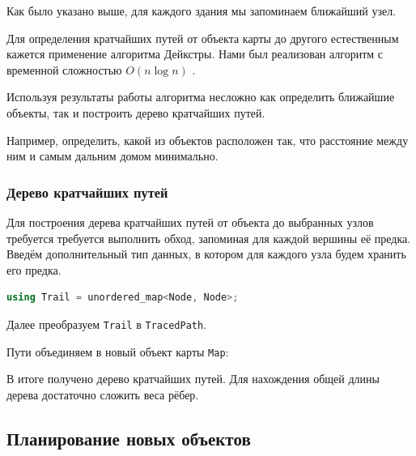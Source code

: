 \documentclass[11pt]{article}
\begin{document}
    Как было указано выше, для каждого здания мы запоминаем ближайший узел.
    
    
    
    Для определения кратчайших путей от объекта карты до другого естественным кажется применение алгоритма Дейкстры.
    Нами был реализован алгоритм с временной сложностью $ O(n \log n) $ \cite{clrs}.
    
    
    
    Используя результаты работы алгоритма несложно как определить ближайшие объекты, так и построить дерево кратчайших путей.
    
    Например, определить, какой из объектов расположен так, что расстояние между ним и самым дальним домом минимально.
    
    

	    
    
	\subsubsection{Дерево кратчайших путей}\label{subsubsection:shortest_paths_tree}    
    
    Для построения дерева кратчайших путей от объекта до выбранных узлов требуется требуется выполнить обход, запоминая для каждой вершины её предка.
    Введём дополнительный тип данных, в котором для каждого узла будем хранить его предка.
    
    \begin{lstlisting}[language=C++]
using Trail = unordered_map<Node, Node>;    
    \end{lstlisting}
    
	

	Далее преобразуем \texttt{Trail} в \texttt{TracedPath}.
	
	

	Пути объединяем в новый объект карты \texttt{Map}:

	

	В итоге получено дерево кратчайших путей.
	Для нахождения общей длины дерева достаточно сложить веса рёбер.
    
	\subsection{Планирование новых объектов}
	
\end{document}
